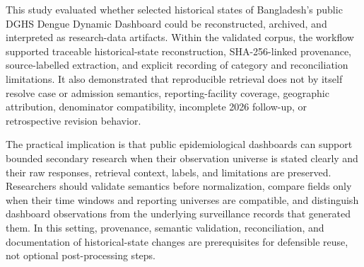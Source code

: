 This study evaluated whether selected historical states of Bangladesh's public DGHS Dengue Dynamic Dashboard could be reconstructed, archived, and interpreted as research-data artifacts. Within the validated corpus, the workflow supported traceable historical-state reconstruction, SHA-256-linked provenance, source-labelled extraction, and explicit recording of category and reconciliation limitations. It also demonstrated that reproducible retrieval does not by itself resolve case or admission semantics, reporting-facility coverage, geographic attribution, denominator compatibility, incomplete 2026 follow-up, or retrospective revision behavior.

The practical implication is that public epidemiological dashboards can support bounded secondary research when their observation universe is stated clearly and their raw responses, retrieval context, labels, and limitations are preserved. Researchers should validate semantics before normalization, compare fields only when their time windows and reporting universes are compatible, and distinguish dashboard observations from the underlying surveillance records that generated them. In this setting, provenance, semantic validation, reconciliation, and documentation of historical-state changes are prerequisites for defensible reuse, not optional post-processing steps.
